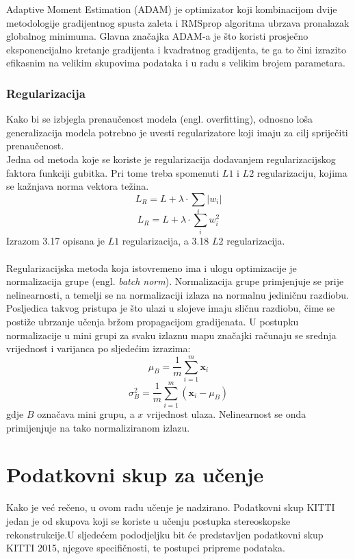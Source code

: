 \documentclass[times, utf8, zavrsni, numeric]{fer}
\begin{document}
Adaptive Moment Estimation (ADAM) je optimizator koji kombinacijom dvije metodologije gradijentnog spusta zaleta i RMSprop algoritma ubrzava pronalazak globalnog minimuma. Glavna značajka ADAM-a je što koristi prosječno eksponencijalno kretanje gradijenta i kvadratnog gradijenta, te ga to čini izrazito efikasnim na velikim skupovima podataka i u radu s velikim brojem parametara\cite{adam}.
\subsection{Regularizacija}
Kako bi se izbjegla prenaučenost modela (engl. overfitting), odnosno loša generalizacija modela potrebno je uvesti regularizatore koji imaju za cilj spriječiti prenaučenost.\\
Jedna od metoda koje se koriste je regularizacija dodavanjem regularizacijskog faktora funkciji gubitka. Pri tome treba spomenuti $L1$ i $L2$ regularizaciju, kojima se kažnjava norma vektora težina.
\begin{equation}
L_{R}= L + \lambda \cdot \sum_{i} |w_{i}|
\label{eq:Aktivacija}
\end{equation}
\begin{equation}
L_{R}= L + \lambda \cdot \sum_{i} w_{i}^2
\label{eq:Aktivacija}
\end{equation}
Izrazom 3.17 opisana je $L1$ regularizacija, a 3.18 $L2$ regularizacija.\\ \\
Regularizacijska metoda koja istovremeno ima i ulogu optimizacije je normalizacija grupe (engl. \textit{batch norm}). Normalizacija grupe primjenjuje se prije nelinearnosti, a temelji se na normalizaciji izlaza na normalnu jediničnu razdiobu. Posljedica takvog pristupa je što ulazi u slojeve imaju sličnu razdiobu, čime se postiže ubrzanje učenja bržom propagacijom gradijenata.
U postupku normalizacije u mini grupi za svaku izlaznu mapu značajki računaju se srednja vrijednost i varijanca po sljedećim izrazima:
\begin{equation}
\mu _{B} = \frac{1}{m}\sum_{i=1}^{m}\textbf{x}_{i}
\label{eq:Aktivacija}
\end{equation}
\begin{equation}
\sigma^{2} _{B} = \frac{1}{m}\sum_{i=1}^{m}\left(\textbf{x}_{i} - \mu_{B} \right)
\label{eq:Aktivacija}
\end{equation}
gdje $B$ označava mini grupu, a $x$ vrijednost ulaza.
Nelinearnost se onda primijenjuje na tako normaliziranom izlazu.
\chapter{Podatkovni skup za učenje}
Kako je već rečeno, u ovom radu učenje je nadzirano. Podatkovni skup KITTI jedan je od skupova koji se koriste u učenju postupka stereoskopske rekonstrukcije.U sljedećem pododjeljku bit će predstavljen podatkovni skup KITTI 2015, njegove specifičnosti, te postupci pripreme podataka.
\end{document}
